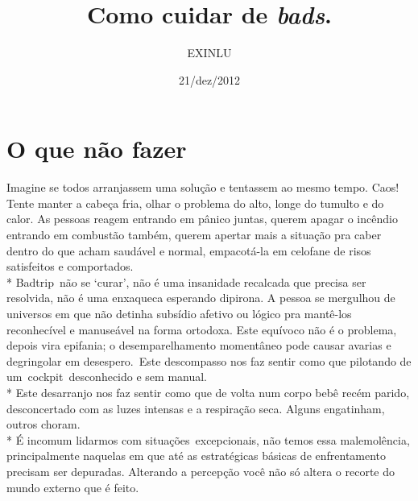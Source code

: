 \documentclass[pdftex]{article}
\begin{document}
%
%
\title{Como cuidar de \textit{bads}.} %
\author{EXINLU}
\date{21/dez/2012}
\maketitle
\renewcommand{\abstractname}{}
\newpage %
%
%
\section*{O que não fazer}
\par
    \indent Imagine se todos arranjassem uma solução e tentassem ao mesmo tempo. Caos! 
    Tente manter a cabeça fria, olhar o problema do alto, longe do tumulto e do 
    calor. As pessoas reagem entrando em pânico juntas, querem apagar o incêndio 
    entrando em combustão também, querem apertar mais a situação pra
    caber dentro do que acham saudável e normal, empacotá-la em celofane de risos 
    satisfeitos e comportados.\\*
    Badtrip não se `curar', não é uma insanidade recalcada que precisa ser 
    resolvida, não é uma enxaqueca esperando dipirona. A
    pessoa se mergulhou de universos em que não detinha subsídio afetivo ou lógico 
    pra mantê-los reconhecível e manuseável na
    forma ortodoxa. Este equívoco não é o problema, depois vira epifania; o 
    desemparelhamento momentâneo pode causar avarias e
    degringolar em desespero. Este descompasso nos faz sentir como que pilotando de 
    um cockpit desconhecido e sem manual.\\*
    Este desarranjo nos faz sentir como que de volta num corpo bebê recém parido, 
    desconcertado com as luzes intensas e a respiração
    seca. Alguns engatinham, outros choram.\\*
    \indent É incomum lidarmos com situações excepcionais, não temos essa 
    malemolência, principalmente naquelas em que até as estratégicas
    básicas de enfrentamento precisam ser depuradas. Alterando a percepção você não 
    só altera o recorte do mundo externo que é
    feito.\\
\end{document}
